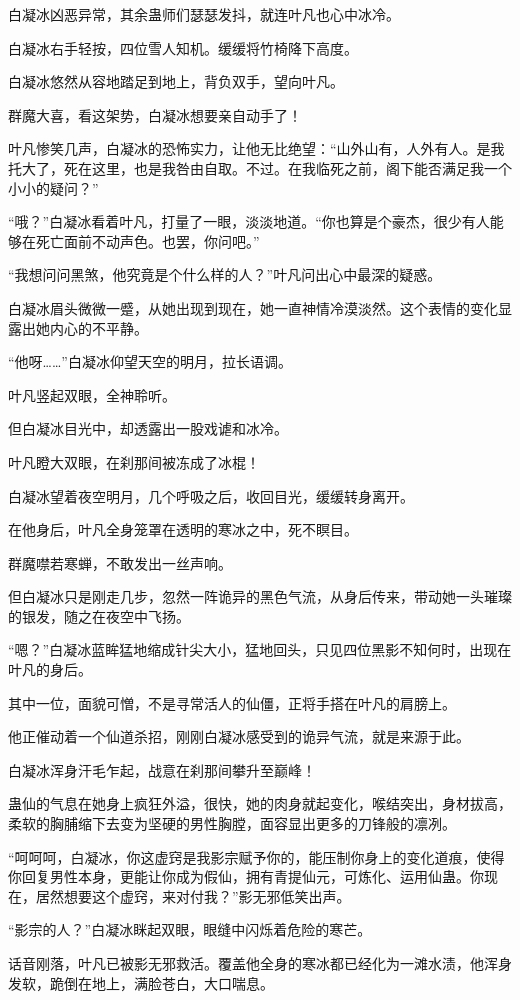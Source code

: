\begin{this_body}
白凝冰凶恶异常，其余蛊师们瑟瑟发抖，就连叶凡也心中冰冷。

白凝冰右手轻按，四位雪人知机。缓缓将竹椅降下高度。

白凝冰悠然从容地踏足到地上，背负双手，望向叶凡。

群魔大喜，看这架势，白凝冰想要亲自动手了！

叶凡惨笑几声，白凝冰的恐怖实力，让他无比绝望：“山外山有，人外有人。是我托大了，死在这里，也是我咎由自取。不过。在我临死之前，阁下能否满足我一个小小的疑问？”

“哦？”白凝冰看着叶凡，打量了一眼，淡淡地道。“你也算是个豪杰，很少有人能够在死亡面前不动声色。也罢，你问吧。”

“我想问问黑煞，他究竟是个什么样的人？”叶凡问出心中最深的疑惑。

白凝冰眉头微微一蹙，从她出现到现在，她一直神情冷漠淡然。这个表情的变化显露出她内心的不平静。

“他呀……”白凝冰仰望天空的明月，拉长语调。

叶凡竖起双眼，全神聆听。

但白凝冰目光中，却透露出一股戏谑和冰冷。

叶凡瞪大双眼，在刹那间被冻成了冰棍！

白凝冰望着夜空明月，几个呼吸之后，收回目光，缓缓转身离开。

在他身后，叶凡全身笼罩在透明的寒冰之中，死不瞑目。

群魔噤若寒蝉，不敢发出一丝声响。

但白凝冰只是刚走几步，忽然一阵诡异的黑色气流，从身后传来，带动她一头璀璨的银发，随之在夜空中飞扬。

“嗯？”白凝冰蓝眸猛地缩成针尖大小，猛地回头，只见四位黑影不知何时，出现在叶凡的身后。

其中一位，面貌可憎，不是寻常活人的仙僵，正将手搭在叶凡的肩膀上。

他正催动着一个仙道杀招，刚刚白凝冰感受到的诡异气流，就是来源于此。

白凝冰浑身汗毛乍起，战意在刹那间攀升至巅峰！

蛊仙的气息在她身上疯狂外溢，很快，她的肉身就起变化，喉结突出，身材拔高，柔软的胸脯缩下去变为坚硬的男性胸膛，面容显出更多的刀锋般的凛冽。

“呵呵呵，白凝冰，你这虚窍是我影宗赋予你的，能压制你身上的变化道痕，使得你回复男性本身，更能让你成为假仙，拥有青提仙元，可炼化、运用仙蛊。你现在，居然想要这个虚窍，来对付我？”影无邪低笑出声。

“影宗的人？”白凝冰眯起双眼，眼缝中闪烁着危险的寒芒。

话音刚落，叶凡已被影无邪救活。覆盖他全身的寒冰都已经化为一滩水渍，他浑身发软，跪倒在地上，满脸苍白，大口喘息。


\end{this_body}
